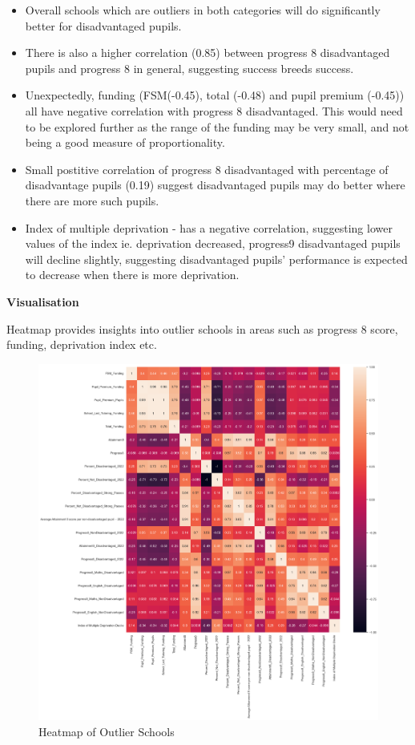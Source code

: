 \documentclass[
  letterpaper,
  DIV=11,
  numbers=noendperiod]{scrartcl}
\providecommand{\tightlist}{%
  \setlength{\itemsep}{0pt}\setlength{\parskip}{0pt}}\usepackage{longtable,booktabs,array}
\begin{document}
\begin{itemize}
\tightlist
\item
  Overall schools which are outliers in both categories will do
  significantly better for disadvantaged pupils.
\item
  There is also a higher correlation (0.85) between progress 8
  disadvantaged pupils and progress 8 in general, suggesting success
  breeds success.
\item
  Unexpectedly, funding (FSM(-0.45), total (-0.48) and pupil premium
  (-0.45)) all have negative correlation with progress 8 disadvantaged.
  This would need to be explored further as the range of the funding may
  be very small, and not being a good measure of proportionality.
\item
  Small postitive correlation of progress 8 disadvantaged with
  percentage of disadvantage pupils (0.19) suggest disadvantaged pupils
  may do better where there are more such pupils.
\item
  Index of multiple deprivation - has a negative correlation, suggesting
  lower values of the index ie. deprivation decreased, progress9
  disadvantaged pupils will decline slightly, suggesting disadvantaged
  pupils' performance is expected to decrease when there is more
  deprivation.
\end{itemize}

\textbf{Visualisation}

Heatmap provides insights into outlier schools in areas such as progress
8 score, funding, deprivation index etc.

\begin{figure}[H]

{\centering \includegraphics{images/obj2_heatmap of outlier schools.png}

}

\caption{Heatmap of Outlier Schools}

\end{figure}%
\end{document}
